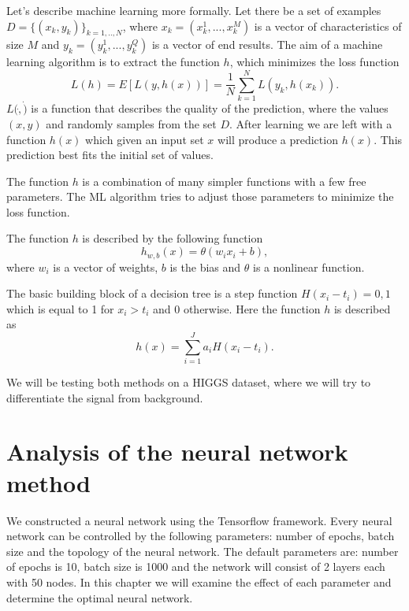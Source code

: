 \documentclass[12pt, a4paper]{article}
\begin{document}
Let's describe machine learning more formally. Let there be a set of examples $D = \{(x_k,y_k)\}_{k=1,..,N}$, where $x_k = (x_k^1, ..., x_k^M)$ is a vector of characteristics of size $M$ and $y_k = (y_k^1, ..., y_k^Q)$ is a vector of end results. The aim of a machine learning algorithm is to extract the function $h$, which minimizes the loss function
\begin{equation}
  L(h) = E[L(y, h(x))] = \frac{1}{N}\sum_{k=1}^N L(y_k, h(x_k)).
\end{equation}
$L(\dot,\dot)$ is a function that describes the quality of the prediction, where the values $(x,y)$  and randomly samples from the set $D$. After learning we are left with a function $h(x)$ which given an input set $x$ will produce a prediction $h(x)$. This prediction best fits the initial set of values.

The function $h$ is a combination of many simpler functions with a few free parameters. The ML algorithm tries to adjust those parameters to minimize the loss function.

The function $h$ is described by the following function
\begin{equation}
  h_{w,b}(x) = \theta(w_i x_i + b),
\end{equation}
where $w_i$ is a vector of weights, $b$ is the bias and $\theta$ is a nonlinear function.

The basic building block of a decision tree is a step function $H(x_i-t_i) = 0, 1$ which is equal to 1 for $x_i > t_i$  and 0 otherwise. Here the function $h$ is described as
\begin{equation}
  h(x) = \sum_{i=1}^J a_i H(x_i-t_i).
\end{equation}

We will be testing both methods on a HIGGS dataset, where we will try to differentiate the signal from background.


\section{Analysis of the neural network method}
We constructed a neural network using the Tensorflow framework. Every neural network can be controlled by the following parameters: number of epochs, batch size and the topology of the neural network. The default parameters are: number of epochs is 10, batch size is 1000 and the network will consist of 2 layers each with 50 nodes. In this chapter we will examine the effect of each parameter and determine the optimal neural network.
\end{document}
